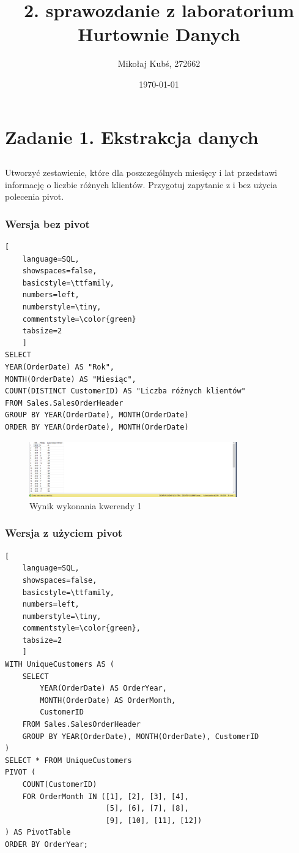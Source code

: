 \documentclass[a4paper,12pt]{article}
\title{2. sprawozdanie z laboratorium Hurtownie Danych}
\author{Mikołaj Kubś, 272662}
\date{\today}
\begin{document}
\maketitle

\section{Zadanie 1. Ekstrakcja danych}

\subsection{}

Utworzyć zestawienie, które dla poszczególnych miesięcy i lat przedstawi informację o liczbie różnych klientów. Przygotuj zapytanie z i bez użycia polecenia pivot.

\subsubsection{Wersja bez pivot}

\begin{lstlisting}[
    language=SQL,
    showspaces=false,
    basicstyle=\ttfamily,
    numbers=left,
    numberstyle=\tiny,
    commentstyle=\color{green}
    tabsize=2
    ]
SELECT 
YEAR(OrderDate) AS "Rok", 
MONTH(OrderDate) AS "Miesiąc", 
COUNT(DISTINCT CustomerID) AS "Liczba różnych klientów"
FROM Sales.SalesOrderHeader
GROUP BY YEAR(OrderDate), MONTH(OrderDate)
ORDER BY YEAR(OrderDate), MONTH(OrderDate)
\end{lstlisting}

\begin{figure}[H]
    \centering
    \includegraphics[width=0.8\textwidth]{images/01_normal.png}
    \caption{Wynik wykonania kwerendy 1}
    \label{fig:1_normal}
\end{figure}

\subsubsection{Wersja z użyciem pivot}

\begin{lstlisting}[
    language=SQL,
    showspaces=false,
    basicstyle=\ttfamily,
    numbers=left,
    numberstyle=\tiny,
    commentstyle=\color{green},
    tabsize=2
    ]
WITH UniqueCustomers AS (
    SELECT 
        YEAR(OrderDate) AS OrderYear, 
        MONTH(OrderDate) AS OrderMonth, 
        CustomerID
    FROM Sales.SalesOrderHeader
    GROUP BY YEAR(OrderDate), MONTH(OrderDate), CustomerID
)
SELECT * FROM UniqueCustomers
PIVOT (
    COUNT(CustomerID) 
    FOR OrderMonth IN ([1], [2], [3], [4], 
                       [5], [6], [7], [8], 
                       [9], [10], [11], [12])
) AS PivotTable
ORDER BY OrderYear;
\end{lstlisting}
\end{document}
